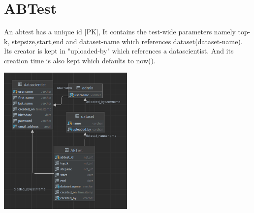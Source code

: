\documentclass[a4paper,12pt]{article}
\begin{document}
	\section{ABTest}		
	An abtest has a unique id [PK], It contains the test-wide parameters namely top-k, stepsize,start,end and dataset-name which references dataset(dataset-name). Its creator is kept in "uploaded-by" which references a datascientist. And its creation time is also kept which defaults to now().
			\begin{center}
		  		\includegraphics[width={250px}]{ABTest.png}
	\end{center}
	
\end{document}
